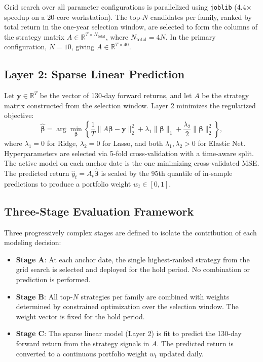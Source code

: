 \documentclass[11pt, letterpaper]{article}
\begin{document}
Grid search over all parameter configurations is parallelized using
\texttt{joblib} (4.4$\times$ speedup on a 20-core workstation). The top-$N$
candidates per family, ranked by total return in the one-year selection
window, are selected to form the columns of the strategy matrix
$A \in \mathbb{R}^{T \times N_{\text{total}}}$, where
$N_{\text{total}} = 4N$. In the primary configuration, $N = 10$, giving
$A \in \mathbb{R}^{T \times 40}$.

\subsection{Layer 2: Sparse Linear Prediction}

Let $\boldsymbol{y} \in \mathbb{R}^T$ be the vector of 130-day forward
returns, and let $A$ be the strategy matrix constructed from the selection
window. Layer 2 minimizes the regularized objective:
\begin{equation}
  \hat{\boldsymbol{\beta}} = \arg\min_{\boldsymbol{\beta}}
  \left\{ \frac{1}{T} \|A\boldsymbol{\beta} - \boldsymbol{y}\|_2^2
  + \lambda_1 \|\boldsymbol{\beta}\|_1
  + \frac{\lambda_2}{2} \|\boldsymbol{\beta}\|_2^2 \right\},
\end{equation}
where $\lambda_1 = 0$ for Ridge, $\lambda_2 = 0$ for Lasso, and both
$\lambda_1, \lambda_2 > 0$ for Elastic Net. Hyperparameters are selected via
5-fold cross-validation with a time-aware split. The active model on each
anchor date is the one minimizing cross-validated MSE. The predicted return
$\hat{y}_t = A_t \hat{\boldsymbol{\beta}}$ is scaled by the 95th quantile of
in-sample predictions to produce a portfolio weight $w_t \in [0, 1]$.

\subsection{Three-Stage Evaluation Framework}

Three progressively complex stages are defined to isolate the contribution of
each modeling decision:

\begin{itemize}
  \item \textbf{Stage A}: At each anchor date, the single highest-ranked
    strategy from the grid search is selected and deployed for the hold
    period. No combination or prediction is performed.
  \item \textbf{Stage B}: All top-$N$ strategies per family are combined with
    weights determined by constrained optimization over the selection window.
    The weight vector is fixed for the hold period.
  \item \textbf{Stage C}: The sparse linear model (Layer 2) is fit to predict
    the 130-day forward return from the strategy signals in $A$. The predicted
    return is converted to a continuous portfolio weight $w_t$ updated daily.
\end{itemize}
\end{document}
